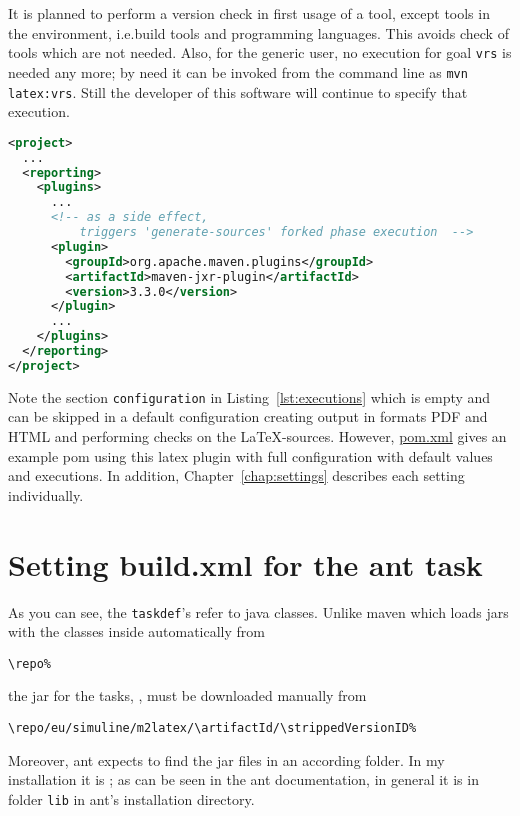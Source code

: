 It is planned to perform a version check in first usage of a tool, 
except tools in the environment, i.e.\@ build tools and programming languages. 
This avoids check of tools which are not needed. 
Also, for the generic user, no execution for goal \texttt{vrs} is needed any more; 
by need it can be invoked from the command line as \texttt{mvn latex:vrs}. 
Still the developer of this software will continue to specify that execution. 



\begin{lstlisting}[language=XML, basicstyle=\footnotesize,
escapechar=|,
float, captionpos=hb, label={lst:forkJxr}, 
caption={Forked execution with jxr plugin}]
<project>
  ...
  <reporting>
    <plugins>
      ...
      <!-- as a side effect, 
          triggers 'generate-sources' forked phase execution  -->
      <plugin>
        <groupId>org.apache.maven.plugins</groupId>
        <artifactId>maven-jxr-plugin</artifactId>
        <version>3.3.0</version>
      </plugin>
      ...
    </plugins>
  </reporting>
</project>
\end{lstlisting}

Note the section \texttt{configuration} in Listing~\ref{lst:executions}
which is empty and can be skipped in a default configuration
creating output in formats PDF and HTML and performing checks on the \LaTeX-sources. 
However, \href{\urlSite fromMain/pom4pdf.xml}{pom.xml} 
gives an example pom using this latex plugin 
with full configuration with default values and executions.
In addition, Chapter~\ref{chap:settings} describes each setting individually. 
\medskip



\section{Setting build.xml for the ant task}\label{sec:xmlBuild}

As you can see, the \texttt{taskdef}'s refer to java classes.
Unlike maven which loads jars with the classes inside automatically
from
% 
\begin{Verbatim}[fontsize=\small, commandchars=\\\{\}]
\repo%
\end{Verbatim}
%
the jar for the tasks, \createdJar,
must be downloaded manually from
%
\begin{Verbatim}[fontsize=\scriptsize, commandchars=\\\{\}]
\repo/eu/simuline/m2latex/\artifactId/\strippedVersionID%
\end{Verbatim}
%
Moreover, ant expects to find the jar files in an according folder.
In my installation it is \antJarDir;
as can be seen in the ant documentation,
in general it is in folder \texttt{lib} in ant's installation directory. 

